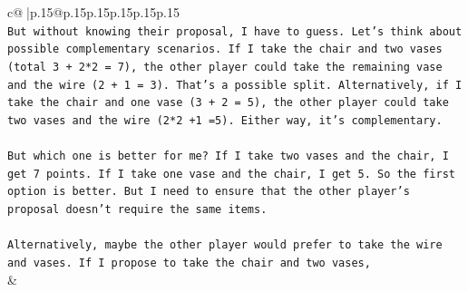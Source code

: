 \documentclass{article}
\begin{document}
{\begin{supertabular}{c@{$\;$}|p{.15\linewidth}@{}p{.15\linewidth}p{.15\linewidth}p{.15\linewidth}p{.15\linewidth}p{.15\linewidth}}
{{{\\ 
\texttt{But without knowing their proposal, I have to guess. Let's think about possible complementary scenarios. If I take the chair and two vases (total 3 + 2*2 = 7), the other player could take the remaining vase and the wire (2 + 1 = 3). That's a possible split. Alternatively, if I take the chair and one vase (3 + 2 = 5), the other player could take two vases and the wire (2*2 +1 =5). Either way, it's complementary.} \\
\\ 
\texttt{But which one is better for me? If I take two vases and the chair, I get 7 points. If I take one vase and the chair, I get 5. So the first option is better. But I need to ensure that the other player's proposal doesn't require the same items.} \\
\\ 
\texttt{Alternatively, maybe the other player would prefer to take the wire and vases. If I propose to take the chair and two vases,} \\
            }
        }
    }
    & \\ \\


\end{supertabular}}
\end{document}
